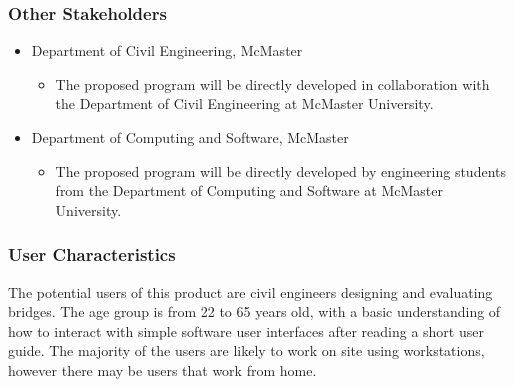 \documentclass[12pt]{article}
\begin{document}
\subsubsection{Other Stakeholders}
\begin{itemize}
  \item Department of Civil Engineering, McMaster
	\begin{itemize}
	  \item{The proposed program will be directly developed in collaboration with the Department of Civil Engineering at McMaster University. }
	\end{itemize}
  \item Department of Computing and Software, McMaster 
	\begin{itemize}
	  \item{The proposed program will be directly developed by engineering students from the Department of Computing and Software at McMaster University.} 
	\end{itemize}
\end{itemize}

\subsubsection{User Characteristics}
The potential users of this product are civil engineers designing and evaluating bridges. The age group is from 22 to 
65 years old, with a basic understanding of how to interact with simple software user interfaces after reading a short 
user guide. The majority of the users are likely to work on site using workstations, however there may be users that 
work from home.
\end{document}
